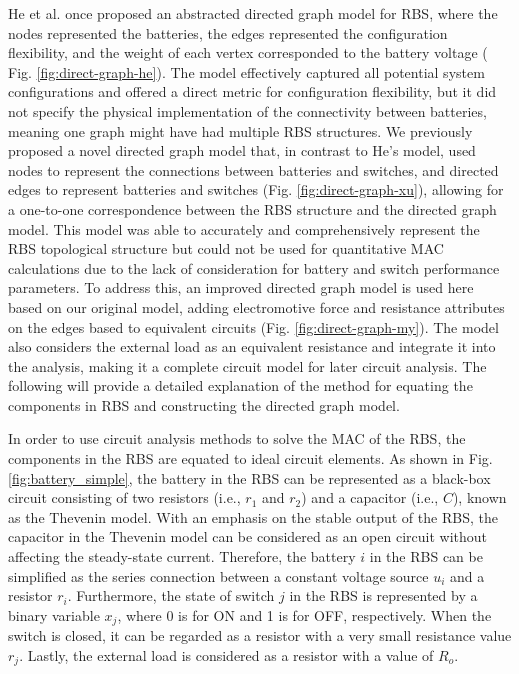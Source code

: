 \documentclass{article}
\begin{document}
He et al. \cite{heExploringAdaptiveReconfiguration2013} once proposed an abstracted directed graph model for RBS, where the nodes represented the batteries, the edges represented the configuration flexibility, and the weight of each vertex corresponded to the battery voltage ( Fig. \ref{fig:direct-graph-he}). 
The model effectively captured all potential system configurations and offered a direct metric for configuration flexibility, but it did not specify the physical implementation of the connectivity between batteries, meaning one graph might have had multiple RBS structures.
We previously proposed a novel directed graph model that, in contrast to He's model, used nodes to represent the connections between batteries and switches, and directed edges to represent batteries and switches (Fig. \ref{fig:direct-graph-xu}), allowing for a one-to-one correspondence between the RBS structure and the directed graph model. 
This model was able to accurately and comprehensively represent the RBS topological structure but could not be used for quantitative MAC calculations due to the lack of consideration for battery and switch performance parameters. 
To address this, an improved directed graph model is used here based on our original model, adding electromotive force and resistance attributes on the edges based to equivalent circuits (Fig. \ref{fig:direct-graph-my}).
The model also considers the external load as an equivalent resistance and integrate it into the analysis, making it a complete circuit model for later circuit analysis.
The following will provide a detailed explanation of the method for equating the components in RBS and constructing the directed graph model.


In order to use circuit analysis methods to solve the MAC of the RBS, the components in the RBS are equated to ideal circuit elements.
As shown in Fig. \ref{fig:battery_simple}, the battery in the RBS can be represented as a black-box circuit consisting of two resistors (i.e., $r_1$ and $r_2$) and a capacitor (i.e., $C$), known as the Thevenin model\cite{hongwenheStateofChargeEstimationLithiumIon2011,mousavig.VariousBatteryModels2014}.
With an emphasis on the stable output of the RBS, the capacitor in the Thevenin model can be considered as an open circuit without affecting the steady-state current.
Therefore, the battery $i$ in the RBS can be simplified as the series connection between a constant voltage source $u_{i}$ and a resistor $r_{i}$.
Furthermore, the state of switch $j$ in the RBS is represented by a binary variable $x_j$, where 0 is for ON and 1 is for OFF, respectively.
When the switch is closed, it can be regarded as a resistor with a very small resistance value $r_{j}$.
Lastly, the external load is considered as a resistor with a value of $R_o$.
\end{document}
